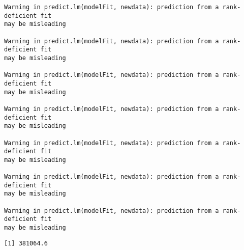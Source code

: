 \documentclass[
  letterpaper,
  DIV=11,
  numbers=noendperiod]{scrartcl}
\begin{document}
\begin{verbatim}
Warning in predict.lm(modelFit, newdata): prediction from a rank-deficient fit
may be misleading

Warning in predict.lm(modelFit, newdata): prediction from a rank-deficient fit
may be misleading

Warning in predict.lm(modelFit, newdata): prediction from a rank-deficient fit
may be misleading

Warning in predict.lm(modelFit, newdata): prediction from a rank-deficient fit
may be misleading

Warning in predict.lm(modelFit, newdata): prediction from a rank-deficient fit
may be misleading

Warning in predict.lm(modelFit, newdata): prediction from a rank-deficient fit
may be misleading

Warning in predict.lm(modelFit, newdata): prediction from a rank-deficient fit
may be misleading
\end{verbatim}

\begin{verbatim}
[1] 381064.6
\end{verbatim}
\end{document}
